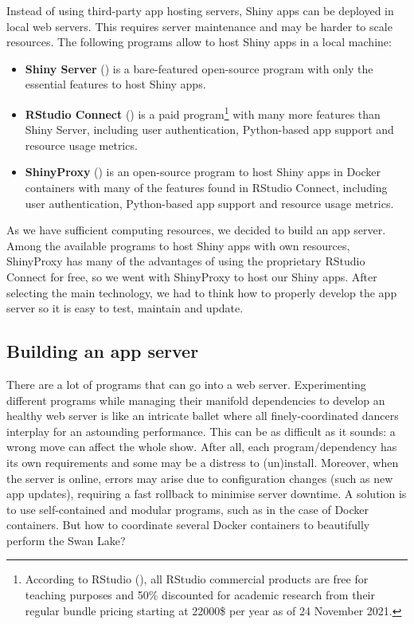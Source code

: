 Instead of using third-party app hosting servers, Shiny apps can be deployed in local web servers. This requires server maintenance and may be harder to scale resources. The following programs allow to host Shiny apps in a local machine:

\begin{itemize}
	\item \textbf{Shiny Server} () is a bare-featured open-source program with only the essential features to host Shiny apps.
	\item \textbf{RStudio Connect} () is a paid program\footnote{According to RStudio (), all RStudio commercial products are free for teaching purposes and 50\% discounted for academic research from their regular bundle pricing starting at 22000\$ per year as of 24 November 2021.} with many more features than Shiny Server, including user authentication, Python-based app support and resource usage metrics.
	\item \textbf{ShinyProxy} () is an open-source program to host Shiny apps in Docker containers with many of the features found in RStudio Connect, including user authentication, Python-based app support and resource usage metrics.
\end{itemize}

As we have sufficient computing resources, we decided to build an app server. Among the available programs to host Shiny apps with own resources, ShinyProxy has many of the advantages of using the proprietary RStudio Connect for free, so we went with ShinyProxy to host our Shiny apps. After selecting the main technology, we had to think how to properly develop the app server so it is easy to test, maintain and update.


\subsection{Building an app server}

There are a lot of programs that can go into a web server. Experimenting different programs while managing their manifold dependencies to develop an healthy web server is like an intricate ballet where all finely-coordinated dancers interplay for an astounding performance. This can be as difficult as it sounds: a wrong move can affect the whole show. After all, each program/dependency has its own requirements and some may be a distress to (un)install. Moreover, when the server is online, errors may arise due to configuration changes (such as new app updates), requiring a fast rollback to minimise server downtime. A solution is to use self-contained and modular programs, such as in the case of Docker containers. But how to coordinate several Docker containers to beautifully perform the Swan Lake?

